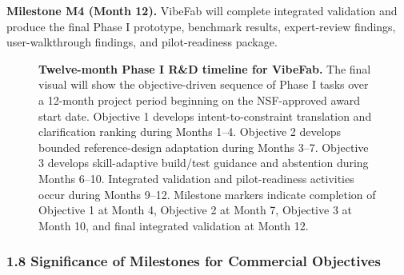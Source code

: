 \textbf{Milestone M4 (Month 12).}
VibeFab will complete integrated validation and produce the final Phase I prototype, benchmark results, expert-review findings, user-walkthrough findings, and pilot-readiness package.

\vspace{-4pt}
\begin{figure}[H]
\centering
{}
\caption{\textbf{Twelve-month Phase I R\&D timeline for VibeFab.} The final visual will show the objective-driven sequence of Phase I tasks over a 12-month project period beginning on the NSF-approved award start date. Objective 1 develops intent-to-constraint translation and clarification ranking during Months 1--4. Objective 2 develops bounded reference-design adaptation during Months 3--7. Objective 3 develops skill-adaptive build/test guidance and abstention during Months 6--10. Integrated validation and pilot-readiness activities occur during Months 9--12. Milestone markers indicate completion of Objective 1 at Month 4, Objective 2 at Month 7, Objective 3 at Month 10, and final integrated validation at Month 12.}
\label{fig:phase1_timeline}
\end{figure}
\subsubsection*{1.8 Significance of Milestones for Commercial Objectives}

